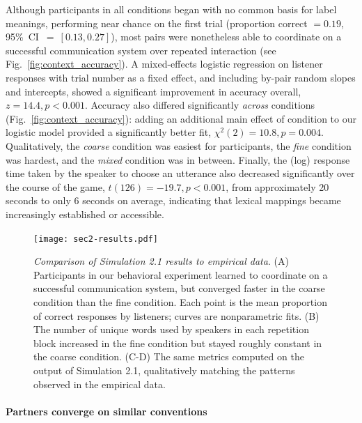 Although participants in all conditions began with no common basis for label meanings, performing near chance on the first trial (proportion correct $= 0.19$, 95\%~CI~$=~[0.13, 0.27]$), most pairs were nonetheless able to coordinate on a successful communication system over repeated interaction (see Fig.\ \ref{fig:context_accuracy}). 
A mixed-effects logistic regression on listener responses with trial number as a fixed effect, and including by-pair random slopes and intercepts, showed a significant improvement in accuracy overall, $z = 14.4, p < 0.001$. 
Accuracy also differed significantly \emph{across} conditions (Fig.\ \ref{fig:context_accuracy}): adding an additional main effect of condition to our logistic model provided a significantly better fit, $\chi^2(2) = 10.8, p = 0.004$. 
Qualitatively, the \emph{coarse} condition was easiest for participants, the \emph{fine} condition was hardest, and the \emph{mixed} condition was in between.
Finally, the (log) response time taken by the speaker to choose an utterance also decreased significantly over the course of the game, $t(126) = -19.7, p < 0.001$, from approximately 20 seconds to only 6 seconds on average, indicating that lexical mappings became increasingly established or accessible.

\begin{figure}[t]
\begin{center}
\texttt{[image: sec2-results.pdf]}
\vspace{1ex}
\caption{\emph{Comparison of Simulation 2.1 results to empirical data}. (A) Participants in our behavioral experiment learned to coordinate on a successful communication system, but converged faster in the coarse condition than the fine condition. Each point is the mean proportion of correct responses by listeners; curves are nonparametric fits. (B) The number of unique words used by speakers in each repetition block increased in the fine condition but stayed roughly constant in the coarse condition. (C-D) The same metrics computed on the output of Simulation 2.1, qualitatively matching the patterns observed in the empirical data.}
\label{fig:lexiconContent}
\end{center}
\end{figure}

\paragraph{Partners converge on similar conventions}

